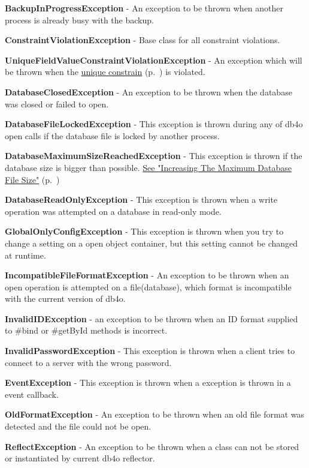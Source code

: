 \textbf{BackupInProgressException} - An exception to be thrown when another process is already busy with the backup.

\textbf{ConstraintViolationException }- Base class for all constraint violations.

\textbf{UniqueFieldValueConstraintViolationException} - An exception which will be thrown when the \hyperref[ref:advanced-topics-unique-constraints]{unique constrain} (p.~\pageref{ref:advanced-topics-unique-constraints}) is violated.

\textbf{DatabaseClosedException} - An exception to be thrown when the database was closed or failed to open.

\textbf{DatabaseFileLockedException} - This exception is thrown during any of db4o open calls if the database file is locked by another process.

\textbf{DatabaseMaximumSizeReachedException} - This exception is thrown if the database size is bigger than possible. \hyperref[ref:troubleshoot-increasing-the-maximum-database-file-size]{See "Increasing The Maximum Database File Size"} (p.~\pageref{ref:troubleshoot-increasing-the-maximum-database-file-size})

\textbf{DatabaseReadOnlyException} - This exception is thrown when a write operation was attempted on a database in read-only mode.

\textbf{GlobalOnlyConfigException} - This exception is thrown when you try to change a setting on a open object container, but this setting cannot be changed at runtime.

\textbf{IncompatibleFileFormatException} - An exception to be thrown when an open operation is attempted on a file(database), which format is incompatible with the current version of db4o.

\textbf{InvalidIDException} - an exception to be thrown when an ID format supplied to \#bind or \#getById methods is incorrect.

\textbf{InvalidPasswordException} - This exception is thrown when a client tries to connect to a server with the wrong password.

\textbf{EventException} - This exception is thrown when a exception is thrown in a event callback.

\textbf{OldFormatException} - An exception to be thrown when an old file format was detected and the file could not be open.

\textbf{ReflectException} - An exception to be thrown when a class can not be stored or instantiated by current db4o reflector.

